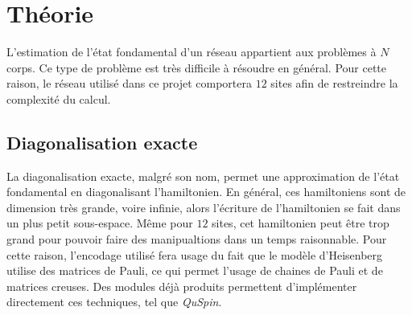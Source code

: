 \documentclass[../main.tex]{subfiles}
\begin{document}
  
  \section{Théorie}
  L'estimation de l'état fondamental d'un réseau appartient aux problèmes à $N$
  corps. Ce type de problème est très difficile à résoudre en général. Pour cette
  raison, le réseau utilisé dans ce projet comportera $12$ sites afin de
  restreindre la complexité du calcul.
  \subsection{Diagonalisation exacte} %
  \label{sub:Diagonalisation exacte}
    La diagonalisation exacte, malgré son nom, permet une approximation de l'état
    fondamental en diagonalisant l'hamiltonien. En général, ces hamiltoniens
    sont de dimension très grande, voire infinie, alors l'écriture de
    l'hamiltonien se fait dans un plus petit sous-espace. Même pour $12$ sites,
    cet hamiltonien peut être trop grand pour pouvoir faire des manipualtions
    dans un temps raisonnable. Pour cette raison, l'encodage utilisé fera usage
    du fait que le modèle d'Heisenberg utilise des matrices de Pauli, ce qui
    permet l'usage de chaines de Pauli et de matrices creuses. Des modules déjà
    produits permettent d'implémenter directement ces techniques, tel que
    \textit{QuSpin}.
  
  
\end{document}
